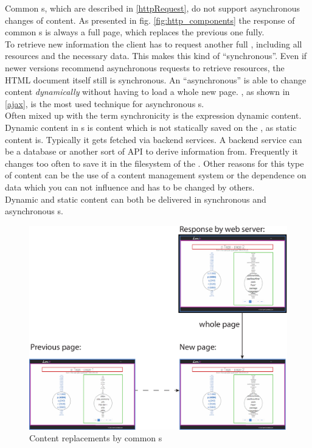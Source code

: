 Common \httpRequest{}s, which are described in \ref{httpRequest}, do not support asynchronous changes of content. As presented in fig. \ref{fig:http_components} the response of common \httpRequest{}s is always a full page, which replaces the previous one fully.
\\
To retrieve new information the client has to request another full \webPage{}, including all resources and the necessary data.
This makes this kind of \webSite{} \enquote{synchronous}.
Even if newer \http{} versions recommend asynchronous requests to retrieve resources, the HTML document itself still is synchronous. 
An \enquote{asynchronous} \webSite{} is able to change content \emph{dynamically} without having to load a whole new page.
\ajax{}, as shown in \ref{ajax}, is the most used technique for asynchronous \webSite{}s.
\\
Often mixed up with the term synchronicity is the expression dynamic content.
Dynamic content in \webSite{}s is content which is not statically saved on the \webServer{}, as static content is.
Typically it gets fetched via backend services.
A backend service can be a database or another sort of API to derive information from.
Frequently it changes too often to save it in the filesystem of the \webServer{}.
Other reasons for this type of content can be the use of a content management system or the dependence on data which you can not influence and has to be changed by others.
\\
Dynamic and static content can both be delivered in synchronous and asynchronous \webApplication{}s.
\\
\begin{figure}[H]
\centering
\includegraphics[width=12cm]{images/http_replacements.pdf}
\caption[ajax_replacements]{Content replacements by common \httpRequest{}s}
\label{fig:ajax_replacements}
\end{figure}

